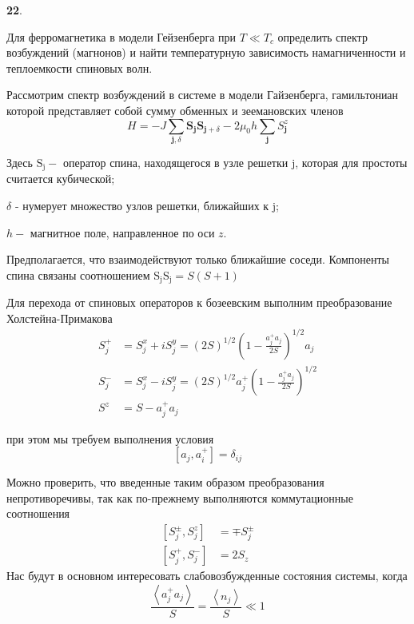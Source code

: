 \documentclass[a4paper,12pt]{article} %
\begin{document}
\begin{ttask} \textbf{22}. 

Для ферромагнетика в модели Гейзенберга при $ T \ll T_c $ определить спектр возбуждений (магнонов) 
и найти температурную зависимость намагниченности и теплоемкости спиновых волн.







Рассмотрим спектр возбуждений в системе в модели Гайзенберга, 
гамильтониан которой представляет собой 
сумму обменных и зеемановских членов
$$
H=
-
J \sum_{\mathbf{j}, \delta} 
\mathbf{S}_{\mathbf{j}} \mathbf{S}_{\mathbf{j}+\delta}
-
2 \mu_{0} h 
\sum_{\mathbf{j}} S_{\mathbf{j}}^{z}
$$

Здесь $\mathrm{S}_{\mathrm{j}}-$ оператор спина, 
находящегося в узле решетки $\mathrm{j}$, 
которая для простоты считается кубической; 

$\delta$ - нумерует множество узлов решетки, ближайших к j; 

$h-$ магнитное поле, направленное по оси $z .$ 

Предполагается, что взаимодействуют только ближайшие соседи. 
Компоненты спина связаны соотношением $\mathrm{S}_{\mathrm{j}} \mathrm{S}_{\mathrm{j}}=S(S+1)$




Для перехода от спиновых операторов к бозеевским 
выполним преобразование Холстейна-Примакова
$$
\begin{aligned}
	S_{j}^{+} &=
	S_{j}^{x}+i S_{j}^{y}
	=
	(2 S)^{1 / 2}\left(1-\frac{a_{j}^{+} a_{j}}{2 S}\right)^{1 / 2} a_{j} 
	\\
	S_{j}^{-} &=
	S_{j}^{x}-i S_{j}^{y}
	=
	(2 S)^{1 / 2} a_{j}^{+}\left(1-\frac{a_{j}^{+} a_{j}}{2 S}\right)^{1 / 2} 
	\\
	S^{z} &=S-a_{j}^{+} a_{j}
\end{aligned}
$$



при этом мы требуем выполнения условия
$$
\left[a_{j}, a_{i}^{+}\right]=\delta_{i j}
$$


Можно проверить, что введенные таким образом преобразования непротиворечивы, 
так как по-прежнему выполняются коммутационные соотношения
$$
\begin{aligned}
	\left[S_{j}^{\pm}, S_{j}^{z}\right] &=\mp S_{j}^{\pm} 
	\\
	\left[S_{j}^{+}, S_{j}^{-}\right] &=2 S_{z}
\end{aligned}
$$
Нас будут в основном интересовать слабовозбужденные состояния системы, когда
$$
\frac{\left\langle a_{j}^{+} a_{j}\right\rangle}{S}
=
\frac{\left\langle n_{j}\right\rangle}{S} 
\ll 1
$$



\end{ttask}
\end{document}
